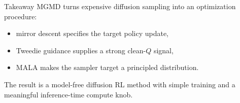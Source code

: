 \documentclass[final,hyperref={pdfpagelabels=false}]{beamer}
\newlength{\colwidth}
\begin{document}
\begin{frame}[t]
\begin{columns}[t]
\begin{column}{\colwidth}
\begin{block}{\Large Takeaway}
\small
MGMD turns expensive diffusion sampling into an optimization procedure:
\begin{itemize}
  \item mirror descent specifies the target policy update,
  \item Tweedie guidance supplies a strong clean-$Q$ signal,
  \item MALA makes the sampler target a principled distribution.
\end{itemize}
The result is a model-free diffusion RL method with simple training and a meaningful inference-time compute knob.
\end{block}
\end{column}
\end{columns}
\end{frame}
\end{document}
